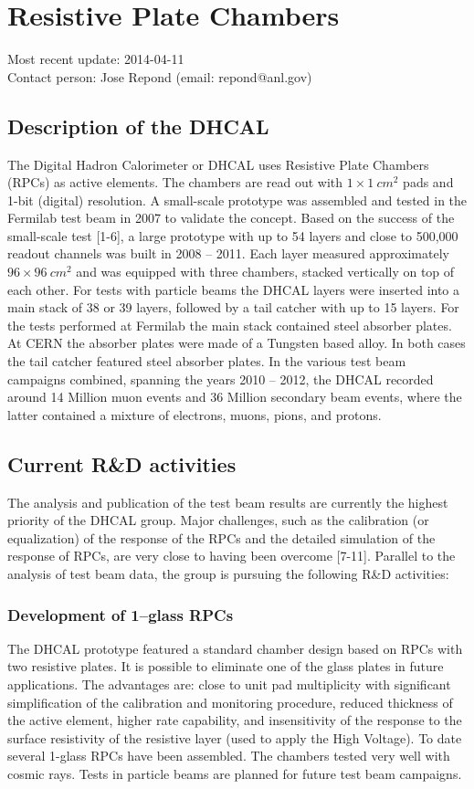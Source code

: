 \section{Resistive Plate Chambers}
Most recent update: 2014-04-11 \\
Contact person: Jose Repond (email: repond@anl.gov)
\subsection{Description of the DHCAL}
The Digital Hadron Calorimeter or DHCAL uses Resistive Plate Chambers (RPCs) as active elements. The chambers are read out with $1 \times \SI{1}{cm^2}$ pads and 1-bit (digital) resolution. A small-scale prototype was assembled and tested in the Fermilab test beam in 2007 to validate the concept.
Based on the success of the small-scale test [1-6], a large prototype with up to 54 layers and close to 500,000 readout channels was built in 2008 -- 2011. Each layer measured approximately $96 \times \SI{96}{cm^2}$ and was equipped with three chambers, stacked vertically on top of each other.
For tests with particle beams the DHCAL layers were inserted into a main stack of 38 or 39 layers, followed by a tail catcher with up to 15 layers. For the tests performed at Fermilab the main stack contained steel absorber plates. At CERN the absorber plates were made of a Tungsten based alloy. In both cases the tail catcher featured steel absorber plates.
In the various test beam campaigns combined, spanning the years 2010 -- 2012, the DHCAL recorded around 14 Million muon events and 36 Million secondary beam events, where the latter contained a mixture of electrons, muons, pions, and protons.
\subsection{Current R\&D activities}
The analysis and publication of the test beam results are currently the highest priority of the DHCAL group. Major challenges, such as the calibration (or equalization) of the response of the RPCs and the detailed simulation of the response of RPCs, are very close to having been overcome [7-11].
Parallel to the analysis of test beam data, the group is pursuing the following R\&D activities:
\subsubsection{Development of 1--glass RPCs}
The DHCAL prototype featured a standard chamber design based on RPCs with two resistive plates. It is possible to eliminate one of the glass plates in future applications. The advantages are: close to unit pad multiplicity with significant simplification of the calibration and monitoring procedure, reduced thickness of the active element, higher rate capability, and insensitivity of the response to the surface resistivity of the resistive layer (used to apply the High Voltage). To date several 1-glass RPCs have been assembled. The chambers tested very well with cosmic rays. Tests in particle beams are planned for future test beam campaigns.

